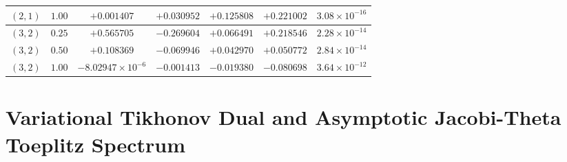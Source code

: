\documentclass[aps,pra,onecolumn,notitlepage,11pt,tightenlines,nofootinbib,floatfix,longbibliography]{revtex4-2}
\theoremstyle{remark}
\begin{document}
\begin{table}[t]
\begin{ruledtabular}
\begin{tabular}{ccccccc}
$(2,1)$ & $1.00$ & $+0.001407$ & $+0.030952$ & $+0.125808$ & $+0.221002$ & $3.08\times 10^{-16}$ \\
\hline
$(3,2)$ & $0.25$ & $+0.565705$ & $-0.269604$ & $+0.066491$ & $+0.218546$ & $2.28\times 10^{-14}$ \\
$(3,2)$ & $0.50$ & $+0.108369$ & $-0.069946$ & $+0.042970$ & $+0.050772$ & $2.84\times 10^{-14}$ \\
$(3,2)$ & $1.00$ & $-8.02947\times 10^{-6}$ & $-0.001413$ & $-0.019380$ & $-0.080698$ & $3.64\times 10^{-12}$ \\
\end{tabular}
\end{ruledtabular}
\end{table}

\section{Variational Tikhonov Dual and Asymptotic Jacobi-Theta Toeplitz Spectrum}
\label{app:tikhonov_toeplitz}
\end{document}

